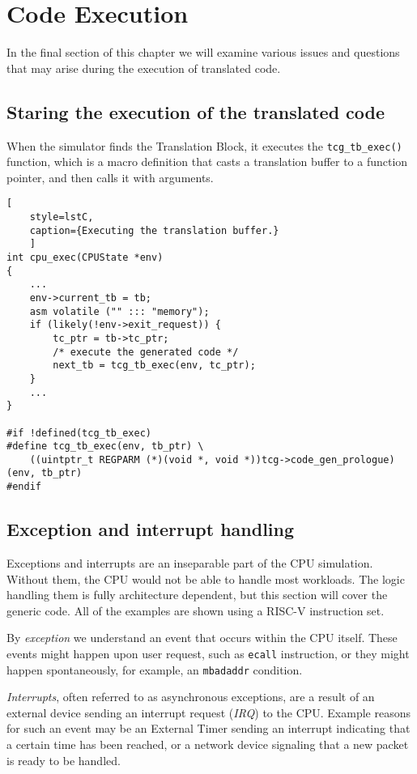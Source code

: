 \pagebreak

\section{Code Execution}
\label{sect:code-execution}

In the final section of this chapter we will examine various issues and questions that may arise during the execution
of translated code.

\subsection{Staring the execution of the translated code}

When the simulator finds the Translation Block, it executes the \texttt{tcg\_tb\_exec()} function, which is a
macro definition that casts a translation buffer to a function pointer, and then calls it with arguments.

\begin{lstlisting}[
    style=lstC,
    caption={Executing the translation buffer.}
    ]
int cpu_exec(CPUState *env)
{
    ...
    env->current_tb = tb;
    asm volatile ("" ::: "memory");
    if (likely(!env->exit_request)) {
        tc_ptr = tb->tc_ptr;
        /* execute the generated code */
        next_tb = tcg_tb_exec(env, tc_ptr);
    }
    ...
}

#if !defined(tcg_tb_exec)
#define tcg_tb_exec(env, tb_ptr) \
    ((uintptr_t REGPARM (*)(void *, void *))tcg->code_gen_prologue)(env, tb_ptr)
#endif
\end{lstlisting}

\subsection{Exception and interrupt handling}

Exceptions and interrupts are an inseparable part of the CPU simulation. Without them, the CPU would not be able to
handle most workloads. The logic handling them is fully architecture dependent, but this section will cover the
generic code. All of the examples are shown using a RISC-V instruction set.

By \textit{exception} we understand an event that occurs within the CPU itself. These events might happen upon user request, such
as \texttt{ecall} instruction, or they might happen spontaneously, for example, an \texttt{mbadaddr} condition.

\textit{Interrupts}, often referred to as asynchronous exceptions, are a result of an external device sending an
interrupt request (\textit{IRQ}) to the CPU. Example reasons for such an event may be an External Timer sending an interrupt indicating that 
a certain time has been reached, or a network device signaling that a new packet is ready to be handled.

